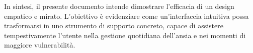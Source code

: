 In sintesi, il presente documento intende dimostrare l'efficacia di un design empatico e mirato.
L'obiettivo è evidenziare come un'interfaccia intuitiva possa trasformarsi in uno strumento di supporto concreto, capace di assistere tempestivamente l'utente nella gestione quotidiana dell'ansia e nei momenti di maggiore vulnerabilità.
